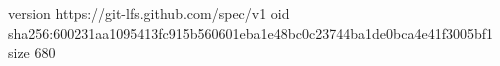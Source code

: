 version https://git-lfs.github.com/spec/v1
oid sha256:600231aa1095413fc915b560601eba1e48bc0c23744ba1de0bca4e41f3005bf1
size 680
